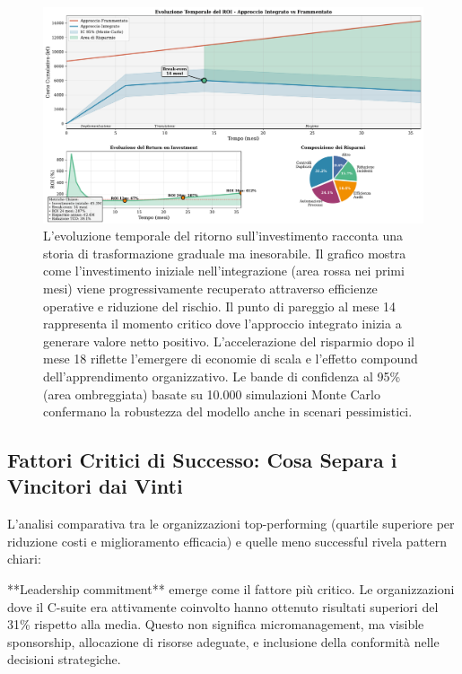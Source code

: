\begin{figure}[htbp]
\centering
\includegraphics[width=\textwidth]{thesis_figures/cap4/figura_4_3_roi_timeline.pdf}
\caption{L'evoluzione temporale del ritorno sull'investimento racconta una storia di trasformazione graduale ma inesorabile. Il grafico mostra come l'investimento iniziale nell'integrazione (area rossa nei primi mesi) viene progressivamente recuperato attraverso efficienze operative e riduzione del rischio. Il punto di pareggio al mese 14 rappresenta il momento critico dove l'approccio integrato inizia a generare valore netto positivo. L'accelerazione del risparmio dopo il mese 18 riflette l'emergere di economie di scala e l'effetto compound dell'apprendimento organizzativo. Le bande di confidenza al 95\% (area ombreggiata) basate su 10.000 simulazioni Monte Carlo confermano la robustezza del modello anche in scenari pessimistici.}
\label{fig:roi_timeline}
\end{figure}

\subsection{Fattori Critici di Successo: Cosa Separa i Vincitori dai Vinti}

L'analisi comparativa tra le organizzazioni top-performing (quartile superiore per riduzione costi e miglioramento efficacia) e quelle meno successful rivela pattern chiari:

**Leadership commitment** emerge come il fattore più critico. Le organizzazioni dove il C-suite era attivamente coinvolto hanno ottenuto risultati superiori del 31\% rispetto alla media. Questo non significa micromanagement, ma visible sponsorship, allocazione di risorse adeguate, e inclusione della conformità nelle decisioni strategiche.

